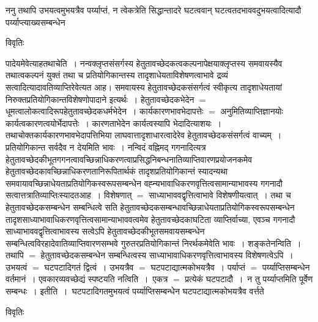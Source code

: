 \documentclass[10pt, openany]{book}
\begin{document}
{{ननु तथापि उभयत्वमुभयत्रैव पर्य्याप्तं, न त्वेकत्रेति सिद्धान्तादरे घटत्ववान् घटत्वतदभाववदुभयत्वादित्यादौ पर्य्याप्त्याख्यसम्बन्धेन }
\begin{center}     विवृतिः \end{center}
पादेयमेवेत्याह\textendash  तथाचेति~। नन्वक्लृप्तसंसर्गस्य हेतुतावच्छेदकत्वकल्पनापेक्षयाक्लृप्तस्य समवायस्यैव तथात्वकल्पनं युक्तं तथा च प्रतियोगिकान्तस्य
तादृशाधेयताविशेषणत्वाभावे द्रव्यं सत्वादित्यादावतिव्याप्तिरेवेत्यत आह। समवायस्य हेतुतावच्छेदकसंसर्गत्वं स्वीकृत्य तादृशाधेयतायां
निरुक्तप्रतियोगिकान्तविशेषणोपादाने इत्यर्थः~। हेतुतावच्छेदकभेदेन $=$ धूमत्वालोकत्वादिरूपहेतुतावच्छेदकधर्मभेदेन~। कार्यकारणभावभेदापत्तेः $=$ अनुमितिव्याप्तिज्ञानयोः
कार्यत्वकारणत्वयोर्भेदापत्तेः~। कारणताभेदेन कार्यत्वस्यापि भेदादित्याशयः~। तथाचोक्तकार्यकारणभावभेदापत्तिभिया लाघवात्तादृशाधारत्वादेरेव हेतुतावच्छेदकसंसर्गत्वं
वाच्यम्~। प्रतियोगिकान्त सर्वदैव न देयमिति भावः~। नन्विदं वह्निमद् गगनादित्यत्र हेतुतावच्छेदकीभूतगगनत्वावच्छिन्नाधिकरणत्वाप्रसिद्धनिबन्धनातिव्याप्तिवारणप्रयोजनकमेव हेतुतावच्छेदकावच्छिन्नाधिकरणतानिरूपितार्थकं तादृशप्रतियोगिकान्तं स्यादन्यथा समवायावच्छिन्नाधेयताप्रतियोगिकस्वरूपसम्बन्धेन वह्न्यभावाधिकरणवृत्तित्वसामान्याभावस्य गगनादौ सत्वात्तत्रातिव्याप्तिःस्यादतआह~। विशेषणात् $=$ साध्याभाववद्वृत्तित्वाभावे विशेषणीयत्वात्~। तथा च हेतुतावच्छेदकसम्बन्धेन सम्बन्धित्वे सति
हेतुतावच्छेदकसम्बन्धावच्छिन्नाधेयताप्रतियोगिकस्वरूपसम्बन्धेन तादृशसाध्याभावाधिकरणवृत्तित्वसामान्याभाववत्वमेव हेतुतावच्छेदकाघटिता व्याप्तिर्वाच्या, एवञ्च गगनादौ
साध्याभाववद्वृत्तित्वाभावस्य सत्वेऽपि हेतुतावच्छेदकीभूतसमवायसम्बन्धेन सम्बन्धित्वविरहादेवातिव्याप्तिवारणसम्भवे गुरुतरप्रतियोगिकान्तं निरर्थकमेवेति भावः~। शङ्कतेनन्विति~। तथापि $=$ हेतुतावच्छेदकसम्बन्धेन सम्बन्धित्वस्य साध्याभावाधिकरणवृत्तित्वाभावस्य विशेषणत्वेऽपि~। उभयत्वं $=$ घटपटादिगतं द्वित्वं~।
उभयत्रैव $=$ घटपटाद्यात्मकोभयत्रैव~। पर्याप्तं $=$ पर्य्याप्तिसम्बन्धेन वर्तमानं~। एवकारव्यवच्छेद्यं स्पष्टयति {\la नत्विति~।}~एकत्र $=$ प्रत्येकं घटपटादौ~।~न तु पर्य्याप्तमिति पूर्वेण सम्बन्धः~। {\la इतीति~।}~घटपटादिगतमुभयत्वं पर्य्याप्तिसम्बन्धेन घटपटाद्यात्मकोभयत्रैव वर्त्तते
\newpage
\begin{center}     विवृतिः \end{center}

}
\end{document}
